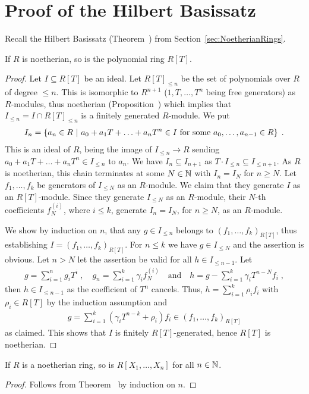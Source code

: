 \documentclass[a4paper,parskip=half,numbers=enddot, DIV=12]{scrreprt}
\renewcommand{\geq}{\geqslant}
\renewcommand{\leq}{\leqslant}
\begin{document}
\section{Proof of the Hilbert Basissatz}
	Recall the Hilbert Basissatz (Theorem~) from Section~\ref{sec:NoetherianRings}.
	\setcounter{thm}{0}
	\begin{thm}
		If $R$ is noetherian, so is the polynomial ring $R[T]$.\nopagebreak
	\end{thm}
	\begin{proof}
		Let $I\subseteq R[T]$ be an ideal. Let $R[T]_{\leq n}$ be the set of polynomials over $R$ of degree $\leq n$. This is isomorphic to $R^{n+1}$ ($1,T,\ldots, T^n$ being free generators) as $R$-modules, thus noetherian (Proposition~) which implies that $I_{\leq n} = I \cap R[T]_{\leq n}$ is a finitely generated $R$-module. \newpage
		We put 
		\begin{align*}
			I_n=\left\{a_n\in R\ \middle|\  a_0+a_1T+\ldots+a_nT^n\in I\text{ for some }a_0,\ldots,a_{n-1}\in R\right\}\;.
		\end{align*}
		This is an ideal of $R$, being the image of $I_{\leq n} \to R$ sending $a_0+a_1T+\ldots+a_nT^n\in I_{\leq n}$ to $a_n$. We have $I_n\subseteq I_{n+1}$ as $T\cdot I_{\leq n}\subseteq I_{\leq n+1}$. As $R$ is noetherian, this chain terminates at some $N\in\mathbb{N}$ with $I_n = I_N$ for $n\geq N$. Let $f_1,\ldots, f_k$ be generators of $I_{\leq N}$ as an $R$-module. We claim that they generate $I$ as an $R[T]$-module. Since they generate $I_{\leq N}$ as an $R$-module, their $N$-th coefficients $f_N^{(i)}$, where $i\leq k$, generate $I_n = I_N$, for $n\geq N$, as an $R$-module.
		
		We show by induction on $n$, that any $g\in I_{\leq n}$ belongs to $\left(f_1,\ldots,f_k\right)_{R[T]}$, thus establishing $I= \left(f_1,\ldots, f_k\right)_{R[T]}$. For $n\leq k$ we have $g\in I_{\leq N}$ and the assertion is obvious. Let $n>N$ let the assertion be valid for all $h \in I_{\leq n-1}$. Let 
		\begin{align*}
			g=\sum_{i=1}^n g_iT^i\;,\quad g_n = \sum_{i=1}^k \gamma_i f_N^{(i)}\quad\text{and}\quad h = g-\sum_{i=1}^k\gamma_i T^{n-N} f_i\;,
		\end{align*}
		then $h\in I_{\leq n-1}$ as the coefficient of $T^n$ cancels. Thus, $h = \sum_{i=1}^k\rho_i f_i$ with $\rho_i\in R[T]$ by the induction assumption and
		\begin{align*}
		g=\sum_{i=1}^k(\gamma_i T^{n-k} +\rho_i) f_i \in \left( f_1,\ldots,f_k\right)_{R[T]}
		\end{align*}
		as claimed. This shows that $I$ is finitely $R[T]$-generated, hence $R[T]$ is noetherian.
	\end{proof}
	\begin{cor}
		If $R$ is a noetherian ring, so is $R[X_1,\ldots,X_n]$ for all $n\in\mathbb{N}$.
	\end{cor}
	\begin{proof}
		Follows from Theorem~ by induction on $n$.
	\end{proof}
\setcounter{thm}{2}
\end{document}
